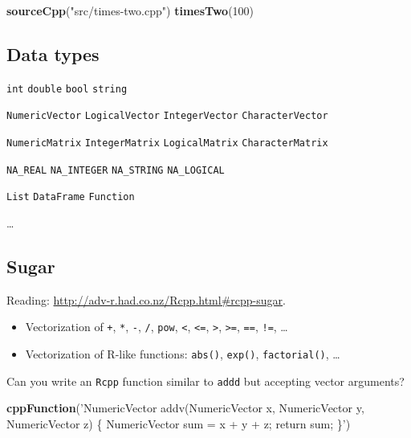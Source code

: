 \documentclass[]{book}
\newenvironment{Shaded}{\begin{snugshade}}{\end{snugshade}}
\newcommand{\KeywordTok}[1]{\textcolor[rgb]{0.13,0.29,0.53}{\textbf{#1}}}
\newcommand{\DecValTok}[1]{\textcolor[rgb]{0.00,0.00,0.81}{#1}}
\newcommand{\StringTok}[1]{\textcolor[rgb]{0.31,0.60,0.02}{#1}}
\newcommand{\NormalTok}[1]{#1}
\theoremstyle{definition}
\theoremstyle{definition}
\theoremstyle{definition}
\theoremstyle{remark}
\let\BeginKnitrBlock\begin \let\EndKnitrBlock\end
\begin{document}
\begin{Shaded}
\begin{Highlighting}[]
\KeywordTok{sourceCpp}\NormalTok{(}\StringTok{"src/times-two.cpp"}\NormalTok{)}
\KeywordTok{timesTwo}\NormalTok{(}\DecValTok{100}\NormalTok{)}
\end{Highlighting}
\end{Shaded}

\subsection{Data types}\label{data-types}

\texttt{int} \texttt{double} \texttt{bool} \texttt{string}

\texttt{NumericVector} \texttt{LogicalVector} \texttt{IntegerVector}
\texttt{CharacterVector}

\texttt{NumericMatrix} \texttt{IntegerMatrix} \texttt{LogicalMatrix}
\texttt{CharacterMatrix}

\texttt{NA\_REAL} \texttt{NA\_INTEGER} \texttt{NA\_STRING}
\texttt{NA\_LOGICAL}

\texttt{List} \texttt{DataFrame} \texttt{Function}

\ldots{}

\subsection{Sugar}\label{sugar}

Reading: \url{http://adv-r.had.co.nz/Rcpp.html\#rcpp-sugar}.

\begin{itemize}
\item
  Vectorization of \texttt{+}, \texttt{*}, \texttt{-}, \texttt{/},
  \texttt{pow}, \texttt{\textless{}}, \texttt{\textless{}=},
  \texttt{\textgreater{}}, \texttt{\textgreater{}=}, \texttt{==},
  \texttt{!=}, \ldots{}
\item
  Vectorization of R-like functions: \texttt{abs()}, \texttt{exp()},
  \texttt{factorial()}, \ldots{}
\end{itemize}

\BeginKnitrBlock{exercise}
\protect\hypertarget{exr:unnamed-chunk-89}{}{\label{exr:unnamed-chunk-89}
}Can you write an \texttt{Rcpp} function similar to \texttt{addd} but
accepting vector arguments?
\EndKnitrBlock{exercise}

\begin{Shaded}
\begin{Highlighting}[]
\KeywordTok{cppFunction}\NormalTok{(}\StringTok{'NumericVector addv(NumericVector x, NumericVector y, NumericVector z) \{}
\StringTok{  NumericVector sum = x + y + z;}
\StringTok{  return sum;}
\StringTok{\}'}\NormalTok{)}
\end{Highlighting}
\end{Shaded}
\end{document}
